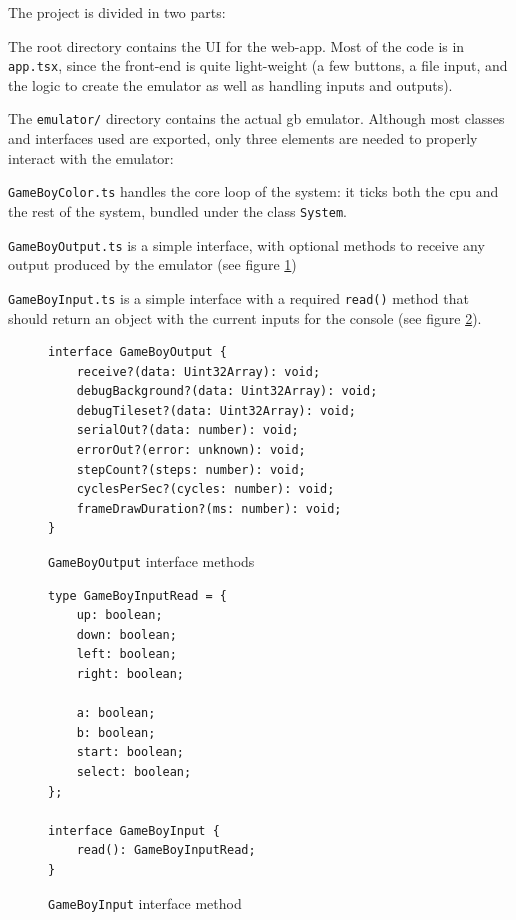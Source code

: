 \documentclass[11pt]{report}
\begin{document}
The project is divided in two parts:
\begin{compactitem}
    \item The root directory contains the UI for the web-app. Most of the code is in \texttt{app.tsx}, since the front-end is quite light-weight (a few buttons, a file input, and the logic to create the emulator as well as handling inputs and outputs).
    \item  The \texttt{emulator/} directory contains the actual \gls{gb} emulator. Although most classes and interfaces used are exported, only three elements are needed to properly interact with the emulator:
    \begin{compactitem}
        \item \texttt{GameBoyColor.ts} handles the core loop of the system: it ticks both the \gls{cpu} and the rest of the system, bundled under the class \texttt{System}.
        \item \texttt{GameBoyOutput.ts} is a simple interface, with optional methods to receive any output produced by the emulator (see figure \ref{fig:gameboyoutput})
        \item \texttt{GameBoyInput.ts} is a simple interface with a required \texttt{read()} method that should return an object with the current inputs for the console (see figure \ref{fig:gameboyinput}).
    \end{compactitem}
\end{compactitem}

\begin{figure}[h]
    \begin{verbatim}
interface GameBoyOutput {
    receive?(data: Uint32Array): void;
    debugBackground?(data: Uint32Array): void;
    debugTileset?(data: Uint32Array): void;
    serialOut?(data: number): void;
    errorOut?(error: unknown): void;
    stepCount?(steps: number): void;
    cyclesPerSec?(cycles: number): void;
    frameDrawDuration?(ms: number): void;
}
    \end{verbatim}
    \caption{\texttt{GameBoyOutput} interface methods}
    \label{fig:gameboyoutput}
\end{figure}

\begin{figure}[h]
    \begin{verbatim}
type GameBoyInputRead = {
    up: boolean;
    down: boolean;
    left: boolean;
    right: boolean;

    a: boolean;
    b: boolean;
    start: boolean;
    select: boolean;
};

interface GameBoyInput {
    read(): GameBoyInputRead;
}
    \end{verbatim}
    \caption{\texttt{GameBoyInput} interface method}
    \label{fig:gameboyinput}
\end{figure}
\end{document}
